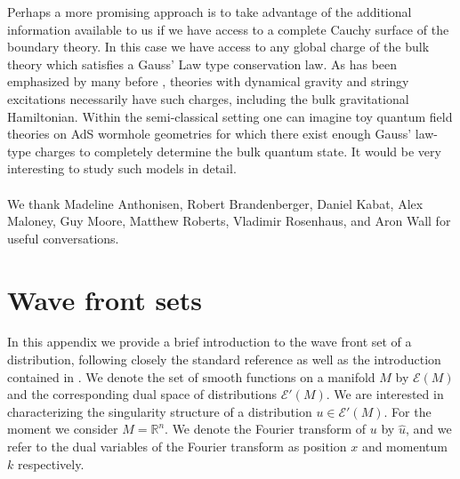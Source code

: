 \documentclass[12pt,a4paper]{article}
\numberwithin{equation}{section}
\def\Reals{\mathbb{R}}
\begin{document}
Perhaps a more promising approach is to take advantage of the
additional information available to us if we have access to a complete
Cauchy surface of the boundary theory. In this case we have access 
to any global charge of the bulk theory which satisfies a Gauss' Law 
type conservation law. 
As has been emphasized by many before
\cite{Balasubramanian:2006aa,Balasubramanian:2006ab,Marolf:2008mf,Marolf:2008mg,Marolf:2013iba},
theories with dynamical gravity and stringy excitations necessarily
have such charges, including the bulk gravitational Hamiltonian.
Within the semi-classical setting one can imagine toy 
quantum field theories on AdS wormhole geometries
for which there exist enough Gauss' law-type charges to completely 
determine the bulk quantum state. It would be very interesting
to study such models in detail.\\


 \\

We thank Madeline Anthonisen, Robert Brandenberger, Daniel Kabat, Alex Maloney, 
Guy Moore, Matthew Roberts, Vladimir Rosenhaus, and Aron Wall for 
useful conversations. 




\appendix


\section{Wave front sets}
\label{app:WF}


In this appendix we provide a brief introduction to the 
wave front set of a distribution, following closely the standard
reference \cite{Hormander:1990aa} as well as the introduction
contained in \cite{Brunetti:1995rf}.
We denote the set of smooth functions on a manifold $M$ by
$\mathcal{E}(M)$ and the corresponding dual space of distributions
$\mathcal{E}'(M)$. 
We are interested in characterizing the singularity structure of 
a distribution $u \in \mathcal{E}'(M)$. 
For the moment we consider $M = \Reals^n$.
We denote the Fourier transform of $u$ by $\hat{u}$, and we refer 
to the dual variables of the Fourier transform as position 
$x$ and momentum $k$ respectively.
\end{document}
